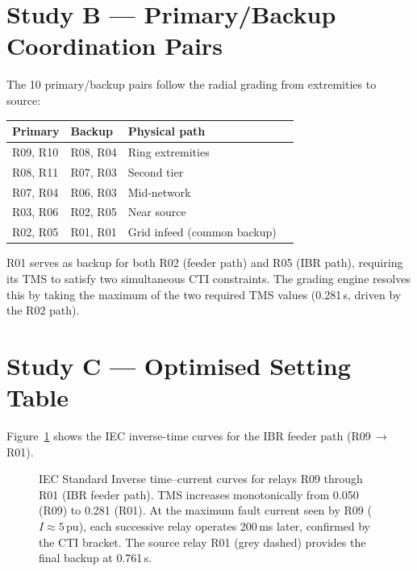 \documentclass[11pt,a4paper]{article}
\begin{document}
\section{Study B --- Primary/Backup Coordination Pairs}
\label{sec:studyB}

The 10 primary/backup pairs follow the radial grading from extremities
to source:

\begin{center}
\begin{tabular}{@{}llll@{}}
\toprule
Primary & Backup & Physical path \\
\midrule
R09, R10 & R08, R04 & Ring extremities \\
R08, R11 & R07, R03 & Second tier \\
R07, R04 & R06, R03 & Mid-network \\
R03, R06 & R02, R05 & Near source \\
R02, R05 & R01, R01 & Grid infeed (common backup) \\
\bottomrule
\end{tabular}
\end{center}

\medskip\noindent
R01 serves as backup for both R02 (feeder path) and R05 (IBR path),
requiring its TMS to satisfy two simultaneous CTI constraints.  The
grading engine resolves this by taking the maximum of the two required
TMS values (0.281\,s, driven by the R02 path).

\section{Study C --- Optimised Setting Table}
\label{sec:studyC}

Figure~\ref{fig:ladder} shows the IEC inverse-time curves for the
IBR feeder path (R09\,$\to$\,R01).

\begin{figure}[htbp]
  \centering
  \resizebox{0.96\textwidth}{!}{}
  \caption{IEC Standard Inverse time--current curves for relays R09
           through R01 (IBR feeder path).  TMS increases monotonically
           from 0.050 (R09) to 0.281 (R01).  At the maximum fault
           current seen by R09 ($I\approx5$\,pu), each successive
           relay operates 200\,ms later, confirmed by the CTI bracket.
           The source relay R01 (grey dashed) provides the final backup
           at 0.761\,s.}
  \label{fig:ladder}
\end{figure}
\end{document}
